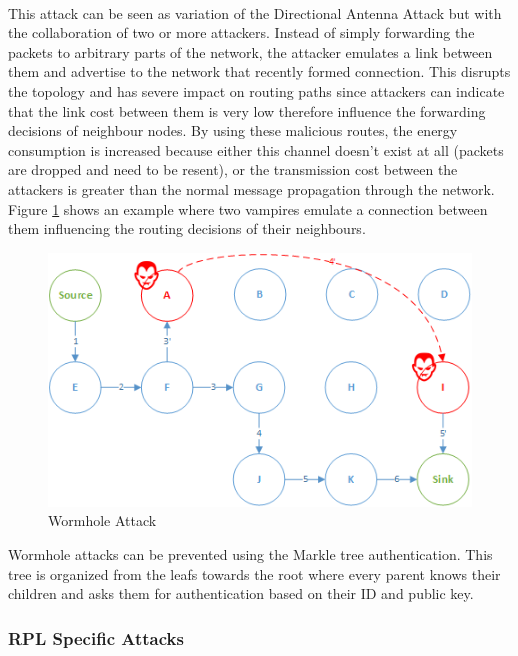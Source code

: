 \paragraph{}
This attack can be seen as variation of the Directional Antenna Attack but with the collaboration of two or more attackers. Instead of simply forwarding the packets to arbitrary parts of the network, the attacker emulates a link between them and advertise to the network that recently formed connection. This disrupts the topology and has severe impact on routing paths since attackers can indicate that the link cost between them is very low therefore influence the forwarding decisions of neighbour nodes. By using these malicious routes, the energy consumption is increased because either this channel doesn't exist at all (packets are dropped and need to be resent), or the transmission cost between the attackers is greater than the normal message propagation through the network. Figure \ref{fig:wormhole_attack} shows an example where two vampires emulate a connection between them influencing the routing decisions of their neighbours.

\begin{figure}[h]
  \centering
  \includegraphics[width=0.8\linewidth]{figures/Wormhole_attack.png}
  \caption{Wormhole Attack}
  \label{fig:wormhole_attack}
\end{figure} 

Wormhole attacks can be prevented using the Markle tree authentication. This tree is organized from the leafs towards the root where every parent knows their children and asks them for authentication based on their ID and public key.

\subsubsection{RPL Specific Attacks}
\paragraph{} 


